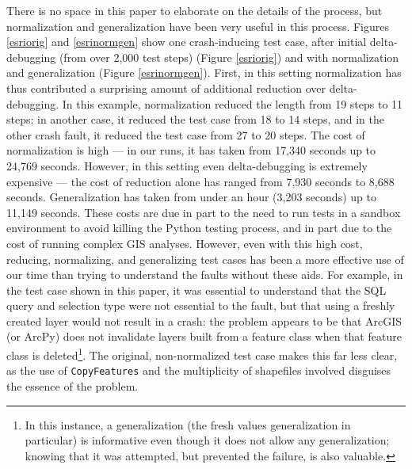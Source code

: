 There is no space in this paper to elaborate on the details of the
process, but normalization and generalization have been very useful in
this process.  Figures \ref{esriorig} and \ref{esrinormgen} show one
crash-inducing test case, after initial delta-debugging (from over
2,000 test steps) (Figure \ref{esriorig}) and with normalization and
generalization (Figure \ref{esrinormgen}).  First, in this setting
normalization has thus contributed a surprising amount of additional
reduction over delta-debugging.  In this example, normalization
reduced the length from 19 steps to 11 steps; in another case, it
reduced the test case from 18 to 14 steps, and in the other crash
fault, it reduced the test case from 27 to 20 steps.  The cost of
normalization is high --- in our runs, it has taken from 17,340
seconds up to 24,769 seconds.  However, in this setting even
delta-debugging is extremely expensive --- the cost of reduction alone
has ranged from 7,930 seconds to 8,688 seconds.  Generalization has
taken from under an hour (3,203 seconds) up to 11,149 seconds.  These
costs are due in part to the need to run tests in a sandbox
environment to avoid killing the Python testing process, and in part
due to the cost of running complex GIS analyses.  However, even with
this high cost, reducing, normalizing, and generalizing test cases has
been a more effective use of our time than trying to understand the
faults without these aids.  For example, in the test case shown in
this paper, it was essential to understand that the SQL query and
selection type were not essential to the fault, but that using a
freshly created layer would not result in a crash:  the problem
appears to be that ArcGIS (or ArcPy) does not invalidate layers built
from a feature class when that feature class is deleted\footnote{In
  this instance, a generalization (the fresh values generalization in
  particular) is informative even though it does not allow any
  generalization; knowing that it was attempted, but prevented the
  failure, is also valuable.}.  The
original, non-normalized test case makes this far less clear, as the
use of {\tt CopyFeatures} and the multiplicity of shapefiles involved
disguises the essence of the problem.

